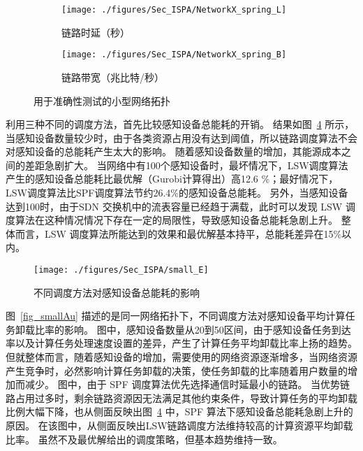 \begin{figure}[!h]
  \centering
  \begin{subfigure}[b]{0.45\linewidth}
    \texttt{[image: ./figures/Sec\_ISPA/NetworkX\_spring\_L]}
    \label{fig_smallNetworkL}
    \caption{链路时延（秒）}
  \end{subfigure} %
  \begin{subfigure}[b]{0.45\linewidth}    
    \texttt{[image: ./figures/Sec\_ISPA/NetworkX\_spring\_B]}
    \label{fig_smallNetworkB}
    \caption{链路带宽（兆比特/秒）}
  \end{subfigure} 
  \caption{用于准确性测试的小型网络拓扑}
  \label{fig_smallNetwork}
\end{figure}

利用三种不同的调度方法，首先比较感知设备总能耗的开销。
结果如图~\ref{fig_smallE} 所示，当感知设备数量较少时，由于各类资源占用没有达到阈值，所以链路调度算法不会对感知设备的总能耗产生太大的影响。
随着感知设备数量的增加，其能源成本之间的差距急剧扩大。
当网络中有100个感知设备时，最坏情况下，LSW调度算法产生的感知设备总能耗比最优解（Gurobi计算得出）高12.6 \%；最好情况下，LSW调度算法比SPF调度算法节约26.4\%的感知设备总能耗。
另外，当感知设备达到100时，由于SDN 交换机中的流表容量已经趋于满载，此时可以发现 LSW 调度算法在这种情况情况下存在一定的局限性，导致感知设备总能耗急剧上升。
整体而言，LSW 调度算法所能达到的效果和最优解基本持平，总能耗差异在15\%以内。

\begin{figure}[!h]
  \centering
  \texttt{[image: ./figures/Sec\_ISPA/small\_E]}
  \vspace{-1em}
  \caption{不同调度方法对感知设备总能耗的影响}
  \label{fig_smallE}
\end{figure}


图~\ref{fig_smallAu} 描述的是同一网络拓扑下，不同调度方法对感知设备平均计算任务卸载比率的影响。
图中，感知设备数量从20到50区间，由于感知设备任务到达率以及计算任务处理速度设置的差异，产生了计算任务平均卸载比率上扬的趋势。
但就整体而言，随着感知设备的增加，需要使用的网络资源逐渐增多，当网络资源产生竞争时，必然影响计算任务卸载的决策，使任务卸载的比率随着用户数量的增加而减少。
图中，由于 SPF 调度算法优先选择通信时延最小的链路。
当优势链路占用过多时，剩余链路资源因无法满足其他约束条件，导致计算任务的平均卸载比例大幅下降，也从侧面反映出图~\ref{fig_smallE} 中，SPF 算法下感知设备总能耗急剧上升的原因。
在该图中，从侧面反映出LSW链路调度方法维持较高的计算资源平均卸载比率。
虽然不及最优解给出的调度策略，但基本趋势维持一致。

